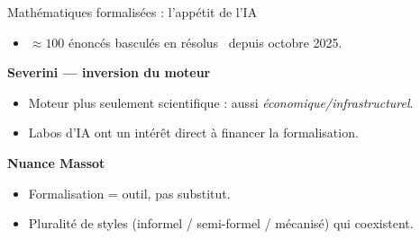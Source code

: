 \documentclass[aspectratio=169]{beamer}
\begin{document}
\begin{frame}{Mathématiques formalisées : l'appétit de l'IA}
{\begin{itemize}
      \item $\approx 100$ énoncés basculés en \og résolus~\fg{} depuis octobre 2025.
    \end{itemize}
    \textbf{Severini --- inversion du moteur}
    \begin{itemize}
      \item Moteur plus seulement scientifique : aussi \emph{économique/infrastructurel}.
      \item Labos d'IA ont un intérêt direct à financer la formalisation.
    \end{itemize}
    \textbf{Nuance Massot}
    \begin{itemize}
      \item Formalisation = outil, pas substitut.
      \item Pluralité de styles (informel / semi-formel / mécanisé) qui coexistent.
    \end{itemize}
  }
\end{frame}
\end{document}
